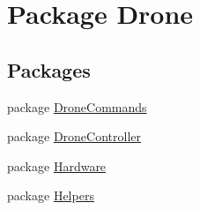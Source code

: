 \hypertarget{namespace_drone}{}\section{Package Drone}
\label{namespace_drone}
\subsection*{Packages}
\begin{DoxyCompactItemize}
\item 
package \hyperlink{namespace_drone_1_1_drone_commands}{Drone\+Commands}
\item 
package \hyperlink{namespace_drone_1_1_drone_controller}{Drone\+Controller}
\item 
package \hyperlink{namespace_drone_1_1_hardware}{Hardware}
\item 
package \hyperlink{namespace_drone_1_1_helpers}{Helpers}
\end{DoxyCompactItemize}
